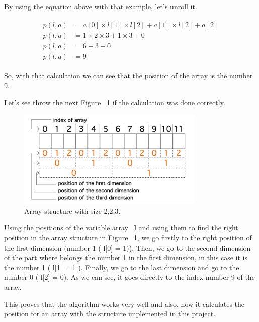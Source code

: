 \documentclass[
  oneside,
  11pt, a4paper,
  footinclude=true,
  headinclude=true,
  cleardoublepage=empty
]{scrbook}
\begin{document}
By using the equation above with that example, let's unroll it.

\begin{equation}
 \begin{matrix}
 \begin{aligned}
  p(l,a) &= a[0] \times l[1] \times l[2] + a[1] \times l[2] + a[2] \\
  p(l,a) &= 1 \times 2 \times 3 + 1 \times 3 + 0 \\
  p(l,a) &= 6 + 3 + 0 \\
  p(l,a) &= 9
 \end{aligned}
 \end{matrix}
\end{equation}

So, with that calculation we can see that the position of the array is the number 9.

Let's see throw the next Figure ~\ref{fig:array_example_calculation} if the calculation was done correctly.

\begin{figure}[h!]
 \centering
  \includegraphics[width=0.8\textwidth]{img/array_example_calculation.png}
  \caption{Array structure with size 2,2,3.}
  \label{fig:array_example_calculation}
\end{figure}

Using the positions of the variable array ~\textbf{l} and using them to find the right position in the array structure in Figure ~\ref{fig:array_example_calculation}, we go firstly to the right position of the first dimension (number 1 ( l[0] = 1)). Then, we go to the second dimension of the part where belongs the number 1 in the first dimension,  in this case it is the number 1 ( l[1] = 1 ). Finally, we go to the last dimension and go to the number 0 ( l[2] = 0).  As we can see, it goes directly to the index number 9 of the array. 

This proves that the algorithm works very well and also, how it calculates the position for an array with the structure implemented in this project.
\end{document}
